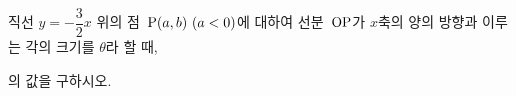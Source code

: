 직선 $y=-\dfrac{3}{2}x$ 위의 점~$\pt{P}(a{,}\mkern3mu\mathopen{}b)\ (a<0)$에 대하여 선분~$\mathrm{OP}$가 $x$축의 양의 방향과 이루는 각의 크기를 $\theta$라 할 때, \par\smallskip{}\par\smallskip\noindent 의 값을 구하시오. 
